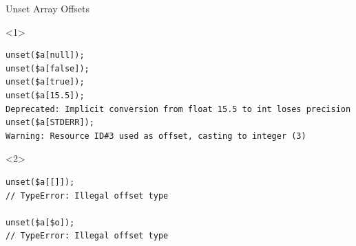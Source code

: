 \documentclass[aspectratio=169]{beamer}
\begin{document}
\begin{frame}[fragile]{Unset Array Offsets}
    \begin{onlyenv}<1>
        \begin{verbatim}
unset($a[null]);
unset($a[false]);
unset($a[true]);
unset($a[15.5]);
Deprecated: Implicit conversion from float 15.5 to int loses precision
unset($a[STDERR]);
Warning: Resource ID#3 used as offset, casting to integer (3)
        \end{verbatim}
    \end{onlyenv}
    \begin{onlyenv}<2>
        \begin{verbatim}
unset($a[[]]);
// TypeError: Illegal offset type

unset($a[$o]);
// TypeError: Illegal offset type
        \end{verbatim}
    \end{onlyenv}
\end{frame}
\end{document}
